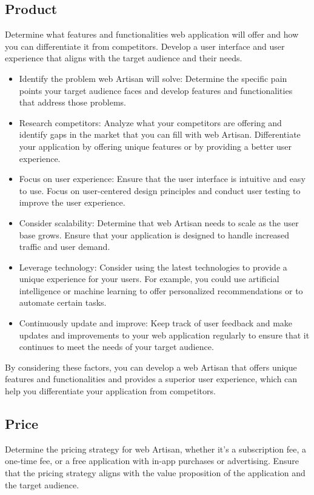 \documentclass[12pt,a4paper]{article}
\begin{document}
\subsection{Product}
Determine what features and functionalities web application will offer and how you can differentiate it from competitors. Develop a user interface and user experience that aligns with the target audience and their needs.
\begin{itemize}
    \item Identify the problem web Artisan will solve: Determine the specific pain points your target audience faces and develop features and functionalities that address those problems.
    \item Research competitors: Analyze what your competitors are offering and identify gaps in the market that you can fill with web Artisan. Differentiate your application by offering unique features or by providing a better user experience.
    \item Focus on user experience: Ensure that the user interface is intuitive and easy to use. Focus on user-centered design principles and conduct user testing to improve the user experience.
    \item Consider scalability: Determine that web Artisan needs to scale as the user base grows. Ensure that your application is designed to handle increased traffic and user demand.
    \item Leverage technology: Consider using the latest technologies to provide a unique experience for your users. For example, you could use artificial intelligence or machine learning to offer personalized recommendations or to automate certain tasks.
    \item Continuously update and improve: Keep track of user feedback and make updates and improvements to your web application regularly to ensure that it continues to meet the needs of your target audience.
\end{itemize}
By considering these factors, you can develop a web Artisan that offers unique features and functionalities and provides a superior user experience, which can help you differentiate your application from competitors.
\subsection{Price}
Determine the pricing strategy for web Artisan, whether it's a subscription fee, a one-time fee, or a free application with in-app purchases or advertising. Ensure that the pricing strategy aligns with the value proposition of the application and the target audience.
\end{document}
